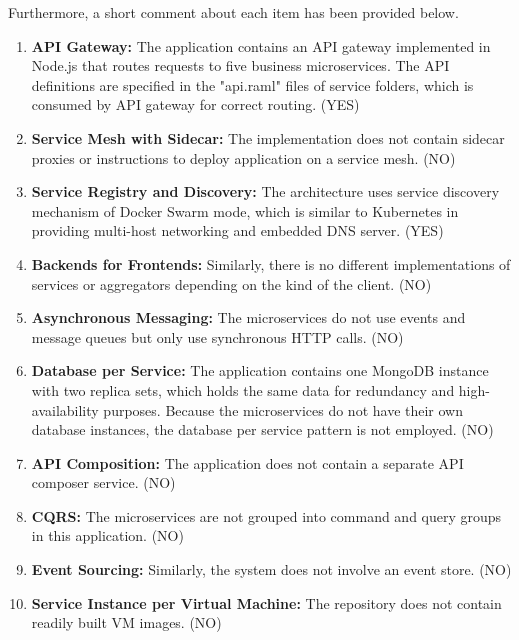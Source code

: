 \documentclass{Configuration_Files/PoliMi3i_thesis}
\begin{document}
Furthermore, a short comment about each item has been provided below.

\begin{enumerate}
    \item \textbf{API Gateway:} The application contains an API gateway implemented in Node.js that routes requests to five business microservices.
    The API definitions are specified in the "api.raml" files of service folders, which is consumed by API gateway for correct routing.
    (YES)
    
    \item \textbf{Service Mesh with Sidecar:} The implementation does not contain sidecar proxies or instructions to deploy application on a service mesh. (NO)
    
    \item \textbf{Service Registry and Discovery:} The architecture uses service discovery mechanism of Docker Swarm mode, which is similar to Kubernetes in providing multi-host networking and embedded DNS server. (YES)
    
    \item \textbf{Backends for Frontends:} Similarly, there is no different implementations of services or aggregators depending on the kind of the client. (NO)
    
    \item \textbf{Asynchronous Messaging:} The microservices do not use events and message queues but only use synchronous HTTP calls. (NO)
    
    \item \textbf{Database per Service:} The application contains one MongoDB instance with two replica sets, which holds the same data for redundancy and high-availability purposes.
    Because the microservices do not have their own database instances, the database per service pattern is not employed. (NO)
    
    \item \textbf{API Composition:} The application does not contain a separate API composer service. (NO)
    
    \item \textbf{CQRS:} The microservices are not grouped into command and query groups in this application. (NO)
    
    \item \textbf{Event Sourcing:} Similarly, the system does not involve an event store. (NO)
    
    \item \textbf{Service Instance per Virtual Machine:} The repository does not contain readily built VM images. (NO)
    

\end{enumerate}
\end{document}
